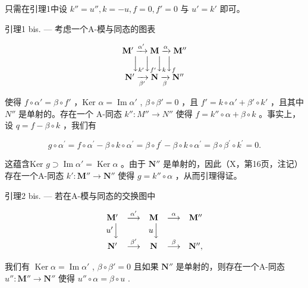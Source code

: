 只需在引理1中设 \(k'' = u'', k = -u, f = 0, f' = 0\) 与 \(u' = k'\) 即可。

引理1 bis. --- 考虑一个A-模与同态的图表

\[
\begin{array}{c} \mathbf {M} ^ {\prime} \xrightarrow {\alpha^ {\prime}} \mathbf {M} \xrightarrow {\alpha} \mathbf {M} ^ {\prime \prime} \\ \Big \downarrow_ {k ^ {\prime}} \Big \downarrow_ {f ^ {\prime}} \Big \downarrow_ {k} \Big \downarrow_ {f} \\ \mathbf {N} ^ {\prime} \xrightarrow [ \beta^ {\prime} ]{} \mathbf {N} \xrightarrow [ \beta ]{} \mathbf {N} ^ {\prime \prime} \end{array}
\]

使得 \(f \circ \alpha' = \beta \circ f'\) ，Ker \(\alpha = \operatorname{Im} \alpha'\) , \(\beta \circ \beta' = 0\) ，且 \(f' = k \circ \alpha' + \beta' \circ k'\) ，且其中 \(N''\) 是单射的。存在一个 A-同态 \(k'' : M'' \to N''\) 使得 \(f = k'' \circ \alpha + \beta \circ k\) 。事实上，设 \(q = f - \beta \circ k\) ，我们有

\[
g \circ \alpha^ {\prime} = f \circ \alpha^ {\prime} - \beta \circ k \circ \alpha^ {\prime} = \beta \circ f ^ {\prime} - \beta \circ k \circ \alpha^ {\prime} = \beta \circ \beta^ {\prime} \circ k ^ {\prime} = 0.
\]

这蕴含Ker \(g \supset \operatorname{Im} \alpha' = \operatorname{Ker} \alpha\) 。由于 \(\mathbf{N}''\) 是单射的，因此（X，第16页，注记）存在一个A-同态 \(k': \mathbf{M}'' \to \mathbf{N}''\) 使得 \(g = k'' \circ \alpha\) ，从而引理得证。

引理2 bis. --- 若在A-模与同态的交换图中

\[
\begin{array}{c c c c c} \mathbf {M} ^ {\prime} & \stackrel {{\alpha^ {\prime}}} {{\longrightarrow}} & \mathbf {M} & \stackrel {{\alpha}} {{\longrightarrow}} & \mathbf {M} ^ {\prime \prime} \\ u ^ {\prime} \Big \downarrow & & u \Big \downarrow & & \\ \mathbf {N} ^ {\prime} & \stackrel {{\beta^ {\prime}}} {{\longrightarrow}} & \mathbf {N} & \stackrel {{\beta}} {{\longrightarrow}} & \mathbf {N} ^ {\prime \prime}, \end{array}
\]

我们有 \(\operatorname{Ker} \alpha = \operatorname{Im} \alpha'\) , \(\beta \circ \beta' = 0\) 且如果 \(\mathbf{N}''\) 是单射的，则存在一个A-同态 \(u'' : \mathbf{M}'' \to \mathbf{N}''\) 使得 \(u'' \circ \alpha = \beta \circ u\) .


